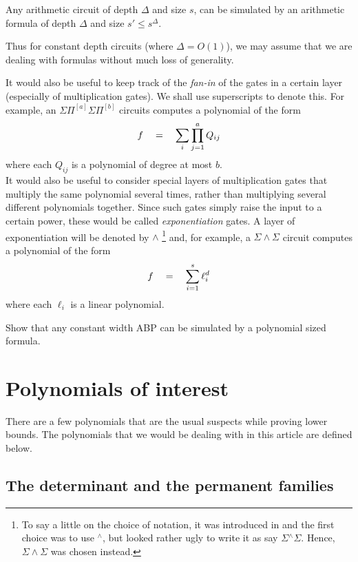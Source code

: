\begin{fact}
Any arithmetic circuit of depth $\Delta$ and size $s$, can be simulated by an arithmetic formula of depth $\Delta$ and size $s' \leq s^{\Delta}$. 
\end{fact}

Thus for constant depth circuits (where $\Delta = O(1)$), we may assume that we are dealing with formulas without much loss of generality.


It would also be useful to keep track of the \emph{fan-in} of the gates in a certain layer (especially of multiplication gates). 
We shall use superscripts to denote this. 
For example, an $\Sigma\Pi^{[a]}\Sigma\Pi^{[b]}$ circuits computes a polynomial of the form
\[
f \quad = \quad \sum_i \prod_{j=1}^a Q_{ij}
\]
where each $Q_{ij}$ is a polynomial of degree at most $b$. \\

It would also be useful to consider special layers of multiplication gates that multiply the same polynomial several times, rather than multiplying several different polynomials together. 
Since such gates simply raise the input to a certain power, these would be called \emph{exponentiation} gates. 
A layer of exponentiation will be denoted by $\wedge$ \footnote{To say a little on the choice of notation, it was introduced in \cite{gkks13b} and the first choice was to use ${}^{\wedge}$, but looked rather ugly to write it as say $\Sigma{}^{\wedge}\Sigma$. 
Hence, $\Sigma\!\wedge\!\Sigma$  was chosen instead. } and, for example, a $\Sigma\!\wedge\!\Sigma$ circuit computes a polynomial of the form 
\[
f\quad = \quad \sum_{i=1}^s \ell_{i}^d
\]
where each $\ell_i$ is a linear polynomial. \\

\begin{exercise}
Show that any constant width ABP can be simulated by a polynomial sized formula. 
\end{exercise}



\section{Polynomials of interest}

There are a few polynomials that are the usual suspects while proving lower bounds. 
The polynomials that we would be dealing with in this article are defined below. 

\subsection*{The determinant and the permanent families}

